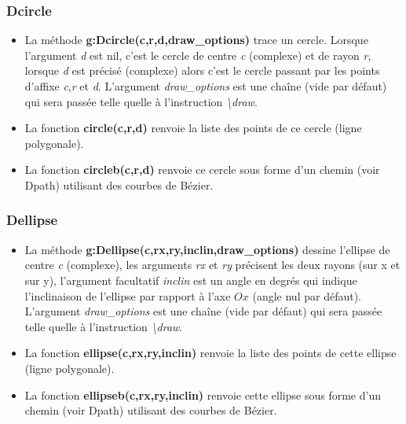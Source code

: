 \subsubsection{Dcircle}
\begin{itemize}
    \item La méthode \textbf{g:Dcircle(c,r,d,draw\_options)} trace un cercle. Lorsque l'argument \emph{d} est nil, c'est le cercle de centre \emph{c} (complexe) et de rayon \emph{r}, lorsque \emph{d} est précisé (complexe) alors c'est le cercle passant par les points d'affixe \emph{c},\emph{r} et \emph{d}. L'argument \emph{draw\_options} est une chaîne (vide par défaut) qui sera passée telle quelle à l'instruction \emph{\textbackslash draw}.
  \item La fonction \textbf{circle(c,r,d)} renvoie la liste des points de ce cercle (ligne polygonale). 
  \item La fonction \textbf{circleb(c,r,d)} renvoie ce cercle sous forme d'un chemin (voir Dpath) utilisant des courbes de Bézier.
\end{itemize}

\subsubsection{Dellipse}
\begin{itemize}
    \item  La méthode \textbf{g:Dellipse(c,rx,ry,inclin,draw\_options)} dessine l'ellipse de centre \emph{c} (complexe), les arguments \emph{rx} et \emph{ry} précisent les deux rayons (sur x et sur y), l'argument facultatif \emph{inclin} est un angle en degrés qui indique l'inclinaison de l'ellipse par rapport à l'axe \(Ox\) (angle nul par défaut). L'argument \emph{draw\_options} est une chaîne (vide par défaut) qui sera passée telle quelle à l'instruction \emph{\textbackslash draw}.
  \item La fonction \textbf{ellipse(c,rx,ry,inclin)} renvoie la liste des points de cette ellipse (ligne polygonale). 
  \item La fonction \textbf{ellipseb(c,rx,ry,inclin)} renvoie cette ellipse sous forme d'un chemin (voir Dpath) utilisant des courbes de Bézier.
\end{itemize}


